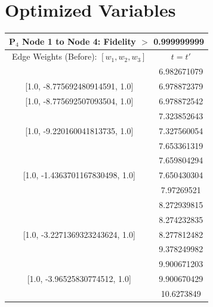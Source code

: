 \documentclass[reprint, aps, 12pt, floatfix]{revtex4-2}
\begin{document}
\section{Optimized Variables}
\begin{center}
    \begin{tabular}{||c c||} 
        \multicolumn{2}{c}{P$_4$ Node 1 to Node 4: Fidelity $>$ 0.999999999}\\
        \hline
        Edge Weights (Before): $[w_1,w_2,w_3]$&$t=t'$\\
        \hline
        [1.0, -8.775678756720122, 1.0]&6.982671079\\

        [1.0, -8.775692480914591, 1.0]&6.978872379\\

        [1.0, -8.775692507093504, 1.0]&6.978872542\\
        \hline
        [1.0, -9.220175551480535, 1.0]&7.323852643\\
        
        [1.0, -9.220160041813735, 1.0]&7.327560054\\
        \hline
        [1.0, -9.644230191589418, 1.0]&7.653361319\\
        \hline
        [1.0, -1.4363696430269532, 1.0]&7.659804294\\

        [1.0, -1.4363701167830498, 1.0]&7.650430304\\
        \hline
        [1.0, 10.050348592504676, 1.0]&7.97269521\\
        \hline
        [1.0, -10.440748415133244, 1.0]&8.272939815\\
        \hline
        [1.0, -3.227133528574531, 1.0]&8.274232835\\

        [1.0, -3.2271369323243624, 1.0]&8.277812482\\
        \hline
        [1.0, 0.16724843366067466, 1.0]&9.378249982\\
        \hline
        [1.0, 3.9652583074360974, 1.0]&9.900671203\\
        
        [1.0, -3.96525830774512, 1.0]&9.900670429\\
        \hline
        [1.0, -4.287482925652273, 1.0]&10.6273849\\
        \hline 
    \end{tabular}
\end{center}
\end{document}
